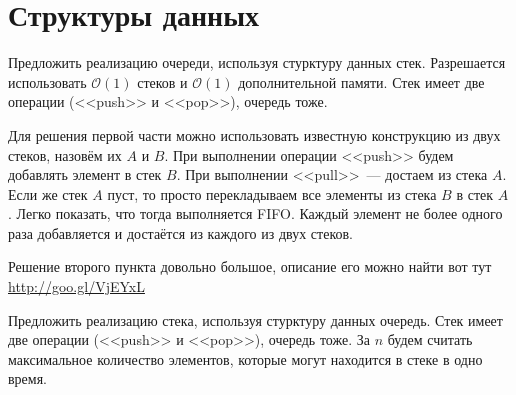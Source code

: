 \documentclass[addpoints]{exam}
\begin{document}
\begin{questions}
\begin{solution}
\end{solution}


\section{Структуры данных}

\question Предложить реализацию очереди, используя стурктуру данных стек. Разрешается использовать $\mathcal{O}(1)$ стеков и $\mathcal{O}(1)$ дополнительной памяти. Стек имеет две операции (<<push>> и <<pop>>), очередь тоже.


\begin{solution}

Для решения первой части можно использовать известную конструкцию из двух стеков, назовём их $A$ и $B$. При выполнении операции <<push>> будем добавлять элемент в стек $B$. При выполнении <<pull>>~--- достаем из стека $A$. Если же стек $A$ пуст, то просто перекладываем все элементы из стека $B$ в стек $A$. Легко показать, что тогда выполняется FIFO. Каждый элемент не более одного раза добавляется и достаётся из каждого из двух стеков.

Решение второго пункта довольно большое, описание его можно найти вот тут \url{http://goo.gl/VjEYxL}

\end{solution}

\question Предложить реализацию стека, используя стурктуру данных очередь. Стек имеет две операции (<<push>> и <<pop>>), очередь тоже. За $n$ будем считать максимальное количество элементов, которые могут находится в стеке в одно время.

\end{questions}
\end{document}
